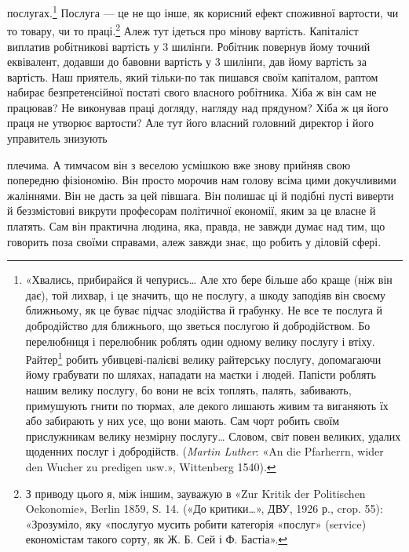 послугах.\footnote{
«Хвались, прибирайся й чепурись\dots{} Але хто бере
більше або краще (ніж він дає), той лихвар, і це значить, що не послугу,
а шкоду заподіяв він своєму ближньому, як це буває підчас злодійства й грабунку.
Не все те послуга й добродійство для ближнього, що зветься послугою й
добродійством. Бо перелюбниця і перелюбник роблять один одному велику
послугу і втіху. Райтер\footnote*{
-військовий, кінник. \emph{Ред.}
}
робить убивцеві-палієві велику райтерську
послугу, допомагаючи йому грабувати по шляхах, нападати на маєтки і
людей. Папісти роблять нашим велику послугу, бо вони не всіх топлять,
палять, забивають, примушують гнити по тюрмах, але декого лишають
живим та виганяють їх або забирають у них усе, що вони мають. Сам чорт
робить своїм прислужникам велику незмірну послугу\dots{} Словом, світ
повен великих, удалих щоденних послуг і добродійств. (\emph{Martin Luther}:
«An die Pfarherrn, wider den Wucher zu predigen usw.», Wittenberg 1540).
} Послуга — це не що інше, як корисний ефект споживної
вартости, чи то товару, чи то праці.\footnote{
З приводу цього я, між іншим, зауважую в «Zur Kritik der Politischen
Oekonomie», Berlin 1859, S. 14. («До критики\dots{}», ДВУ, 1926 р.,
crop. 55): «Зрозуміло, яку «послугуо мусить робити категорія «послуг»
(service) економістам такого сорту, як Ж. Б. Сей і Ф. Бастіа».
} Алеж тут ідеться
про мінову вартість. Капіталіст виплатив робітникові вартість
у 3 шилінґи. Робітник повернув йому точний еквівалент, додавши
до бавовни вартість у 3 шилінґи, дав йому вартість за вартість.
Наш приятель, який тільки-по так пишався своїм капіталом,
раптом набирає безпретенсійної постаті свого власного робітника.
Хіба ж він сам не працював? Не виконував праці догляду, нагляду
над прядуном? Хіба ж ця його праця не утворює вартости?
Але тут його власний головний директор і його управитель знизують

плечима. А тимчасом він з веселою усмішкою вже знову прийняв
свою попередню фізіономію. Він просто морочив нам голову
всіма цими докучливими жаліннями. Він не дасть за цей півшага.
Він полишає ці й подібні пусті виверти й беззмістовні викрути
професорам політичної економії, яким за це власне й платять.
Сам він практична людина, яка, правда, не завжди думає над тим,
що говорить поза своїми справами, алеж завжди знає, що робить
у діловій сфері.

